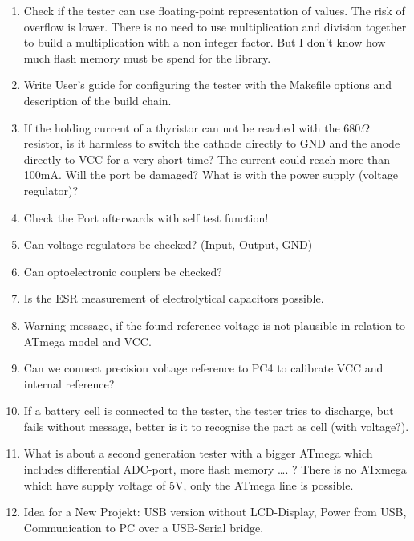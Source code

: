 \begin{enumerate}
\item Check if the tester can use floating-point representation of  values. The risk of overflow  is lower.
There is no need to use multiplication and division together to build a multiplication with a non integer factor.
But I don't know how much flash memory must be spend for the library.
\item Write User's guide for configuring the tester with the Makefile options and description of the build chain.
\item If the holding current of a thyristor can not be reached with the \(680\Omega\) resistor, is it harmless to switch the cathode directly to GND
and the anode directly to VCC for a very short time?
The current could reach more than 100mA. Will the port be damaged? What is with the power supply (voltage regulator)?
\item Check the Port afterwards with self test function!
\item Can voltage regulators be checked? (Input, Output, GND)
\item Can optoelectronic couplers be checked?  
\item Is the ESR measurement of electrolytical capacitors  possible.
\item Warning message, if the found reference voltage is not plausible in relation to ATmega model and VCC.
\item Can we connect precision voltage reference to PC4 to calibrate VCC and internal reference?
\item If a battery cell is connected to the tester, the tester tries to discharge,
but fails without message, better is it to recognise the part as cell (with voltage?).
\item What is about a second generation tester with a bigger ATmega which includes differential ADC-port, more flash memory …. ?
There is no ATxmega which have supply voltage of 5V, only the ATmega line  is possible. 
\item Idea for a New Projekt: USB  version without LCD-Display, Power from USB, Communication to PC over a USB-Serial bridge.
\end{enumerate}
